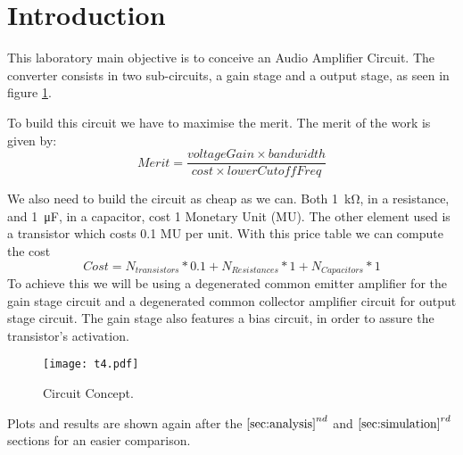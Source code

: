 \section{Introduction}

This laboratory main objective is to conceive an Audio Amplifier Circuit. The converter consists in two sub-circuits, a gain stage and a output stage, as seen in figure \ref{Fig1: circuit}.

To build this circuit we have to maximise the merit. The merit of the work is given by:
\begin{equation}
    Merit = \dfrac{voltageGain \times bandwidth}{cost \times lowerCutoffFreq}
\end{equation}

We also need to build the circuit as cheap as we can. Both \SI{1}{\kilo\ohm}, in a resistance, and \SI{1}{\micro\farad}, in a capacitor, cost 1 Monetary Unit (MU). The other element used is a transistor which costs 0.1 MU per unit.
With this price table we can compute the cost
\begin{equation}
    Cost = N_{transistors}*0.1+N_{Resistances}*1+N_{Capacitors}*1
\end{equation}
To achieve this we will be using a degenerated common emitter amplifier for the gain stage circuit and a degenerated common collector amplifier circuit for output stage circuit. The gain stage also features a bias circuit, in order to assure the transistor's activation.

\begin{figure}[h] 
\centering
\texttt{[image: t4.pdf]}
\caption{Circuit Concept.}
\label{Fig1: circuit}
\end{figure}

Plots and results are shown again after the $\ref{sec:analysis}^{nd}$ and $\ref{sec:simulation}^{rd}$ sections for an easier comparison.
